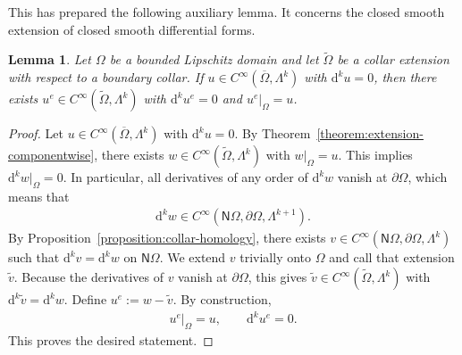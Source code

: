 \documentclass[10pt,a4paper]{amsart}
\newtheorem{lemma}[theorem]{Lemma}
\theoremstyle{definition}
\theoremstyle{remark}
\numberwithin{equation}{section}
\newcommand{\sfN}{{\mathsf N}}
\newcommand{\closure}{\overline}
\renewcommand{\restriction}{|}
\newcommand{\cartan}{{\mathrm d}}
\newcommand{\Domain}{{\Omega}}
\newcommand{\collaredDomain}{{\widetilde\Omega}}
\newcommand{\Collar}{{\sfN\Omega}}
\newcommand{\Alt}[1]{\Lambda^{#1}}
\begin{document}
This has prepared the following auxiliary lemma. It concerns the closed smooth extension of closed smooth differential forms.  

\begin{lemma}\label{lemma:closed-extension}
    Let $\Domain$ be a bounded Lipschitz domain and let $\collaredDomain$ be a collar extension with respect to a boundary collar.
    If $u \in C^{\infty}(\closure\Domain,\Alt{k})$ with $\cartan^{k} u = 0$,
    then there exists $u^{e} \in C^{\infty}(\collaredDomain,\Alt{k})$ with $\cartan^{k} u^{e} = 0$ and $u^{e} \restriction_{\Domain} = u$.
\end{lemma}
\begin{proof}
    Let $u \in C^{\infty}(\closure\Domain,\Alt{k})$ with $\cartan^{k} u = 0$.
    By Theorem~\ref{theorem:extension-componentwise}, there exists $w \in C^{\infty}(\collaredDomain,\Alt{k})$ with $w \restriction_{\Domain} = u$. 
    This implies $\cartan^{k} w \restriction_{\Domain} = 0$.
    In particular, all derivatives of any order of $\cartan^{k} w$ vanish at $\partial\Domain$, which means that
    \begin{align*}
        \cartan^{k} w \in C^{\infty}( \Collar, \partial\Domain, \Alt{k+1} ).
    \end{align*}
    By Proposition~\ref{proposition:collar-homology}, there exists $v \in C^{\infty}( \Collar, \partial\Domain, \Alt{k} )$
    such that $\cartan^{k} v = \cartan^{k} w$ on $\Collar$.
    We extend $v$ trivially onto $\Domain$ and call that extension $\widetilde{v}$.
    Because the derivatives of $v$ vanish at $\partial\Domain$, 
    this gives $\widetilde{v} \in C^{\infty}( \collaredDomain, \Alt{k} )$ with $\cartan^{k} \widetilde{v} = \cartan^{k} w$.
    Define $u^{e} := w - \widetilde{v}$. By construction, 
    \begin{align*}
        u^{e} \restriction_{\Domain} = u, \qquad \cartan^{k} u^{e} = 0.
    \end{align*}
    This proves the desired statement. 
\end{proof}
\end{document}
